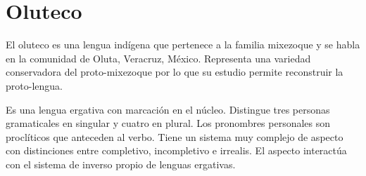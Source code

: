 \section*{Oluteco}

\noindent El oluteco es una lengua indígena que pertenece a la familia mixezoque y se habla en la comunidad de Oluta, Veracruz, México. Representa una variedad conservadora del proto-mixezoque por lo que su estudio permite reconstruir la proto-lengua.

Es una lengua ergativa con marcación en el núcleo. Distingue tres personas gramaticales en singular y cuatro en plural. Los pronombres personales son proclíticos que anteceden al verbo. Tiene un sistema muy complejo de aspecto con distinciones entre completivo, incompletivo e irrealis. El aspecto interactúa con el sistema de inverso propio de lenguas ergativas. \vspace{0.5cm}

